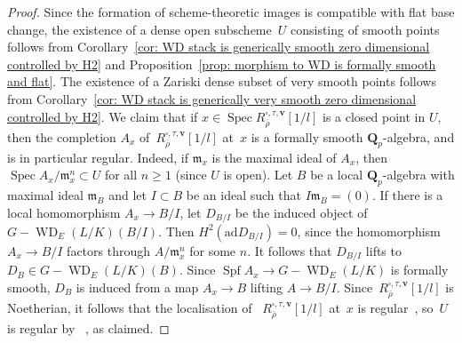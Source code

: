 \documentclass{amsart}
\renewcommand{\mathbb}{\mathbf}
\def\ad{\mathrm{ad}}
\theoremstyle{definition}
\theoremstyle{remark}
\newcommand{\mar}[1]{}
\newcommand{\mar}[1]{\marginpar{\raggedright\tiny squirrel #1}}
\newcommand{\Q}{\QQ}
\newcommand{\QQ}{{\mathbb Q}}
\newcommand{\Qp}{\Q_p}
\DeclareMathOperator{\Spec}{Spec}
\DeclareMathOperator{\Spf}{Spf}
\DeclareMathOperator{\WD}{WD}
\newcommand{\rhobar}{\overline{\rho}}
\begin{document}
\begin{proof}
  Since the formation of scheme-theoretic images is compatible with
  flat base change, the existence of a dense open subscheme~$U$ consisting of smooth points
  follows from Corollary~\ref{cor: WD stack is generically smooth zero dimensional
  controlled by H2} and Proposition~\ref{prop: morphism to WD is formally smooth and flat}.  The existence of a Zariski dense subset of very smooth points follows from Corollary~\ref{cor: WD stack is generically very smooth zero dimensional
  controlled by H2}. %
We claim that if $x\in \Spec
R_{\rhobar}^{\square,\tau,\mathbf{v}}[1/l]$ is a closed point in $U$,
then the completion $A_x$
of~$R_{\rhobar}^{\square,\tau,\mathbf{v}}[1/l]$ at~$x$ is a formally
smooth $\Qp$-algebra, and is in particular regular.  Indeed, if $\mathfrak{m}_x$ is the maximal
ideal of $A_x$, then $\Spec A_x/\mathfrak{m}_x^n\subset U$ for all
$n\geq 1$ (since $U$ is open).  Let $B$ be a local $\Q_p$-algebra with
maximal ideal $\mathfrak{m}_B$ and let $I\subset B$ be an ideal such
that $I\mathfrak{m}_B=(0)$.  If there is a local homomorphism
$A_x\rightarrow B/I$, let $D_{B/I}$ be the induced object of
$G-\WD_E(L/K)(B/I)$.  Then $H^2(\ad D_{B/I})=0$, since the homomorphism
$A_x\rightarrow B/I$ factors through $A/\mathfrak{m}_x^n$ for some
$n$.  It follows that $D_{B/I}$ lifts to $D_B\in G-\WD_E(L/K)(B)$.
Since $\Spf A_x\rightarrow G-\WD_E(L/K)$ is formally smooth, $D_B$ is
induced from a map $A_x\rightarrow B$ lifting $A\rightarrow
B/I$. Since~$R_{\rhobar}^{\square,\tau,\mathbf{v}}[1/l]$ is
Noetherian, it follows that the localisation of
~$R_{\rhobar}^{\square,\tau,\mathbf{v}}[1/l]$ at~$x$ is
regular~\cite[\href{http://stacks.math.columbia.edu/tag/07NY}{Tag
  07NY}]{stacks-project}, so~$U$ is regular by~\cite[\href{http://stacks.math.columbia.edu/tag/02IT}{Tag 02IT}]{stacks-project}
, as claimed.


\end{proof}
\end{document}
